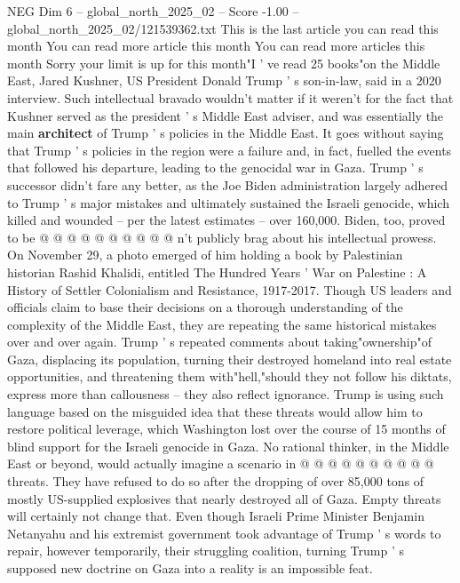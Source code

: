\begin{textsample}{NEG Dim 6 – global\_north\_2025\_02 – Score -1.00 – global\_north\_2025\_02/121539362.txt}  \label{ex:f6_neg_079}
This is the last article you can read this month You can read more article this month You can read more articles this month Sorry your limit is up for this month"I ' ve read 25 books"on the Middle East, Jared Kushner, US President Donald Trump ' s son-in-law, said in a 2020 interview.
Such intellectual bravado wouldn't matter if it weren't for the fact that Kushner served as the president ' s Middle East adviser, and was essentially the main \textbf{architect} of Trump ' s policies in the Middle East.
It goes without saying that Trump ' s policies in the region were a failure and, in fact, fuelled the events that followed his departure, leading to the genocidal war in Gaza.
Trump ' s successor didn't fare any better, as the Joe Biden administration largely adhered to Trump ' s major mistakes and ultimately sustained the Israeli genocide, which killed and wounded -- per the latest estimates -- over 160,000.
Biden, too, proved to be @ @ @ @ @ @ @ @ @ @ n't publicly brag about his intellectual prowess.
On November 29, a photo emerged of him holding a book by Palestinian historian Rashid Khalidi, entitled The Hundred Years ' War on Palestine : A History of Settler Colonialism and Resistance, 1917-2017.
Though US leaders and officials claim to base their decisions on a thorough understanding of the complexity of the Middle East, they are repeating the same historical mistakes over and over again.
Trump ' s repeated comments about taking"ownership"of Gaza, displacing its population, turning their destroyed homeland into real estate opportunities, and threatening them with"hell,"should they not follow his diktats, express more than callousness -- they also reflect ignorance.
Trump is using such language based on the misguided idea that these threats would allow him to restore political leverage, which Washington lost over the course of 15 months of blind support for the Israeli genocide in Gaza.
No rational thinker, in the Middle East or beyond, would actually imagine a scenario in @ @ @ @ @ @ @ @ @ @ threats.
They have refused to do so after the dropping of over 85,000 tons of mostly US-supplied explosives that nearly destroyed all of Gaza.
Empty threats will certainly not change that.
Even though Israeli Prime Minister Benjamin Netanyahu and his extremist government took advantage of Trump ' s words to repair, however temporarily, their struggling coalition, turning Trump ' s supposed new doctrine on Gaza into a reality is an impossible feat.

\end{textsample}
